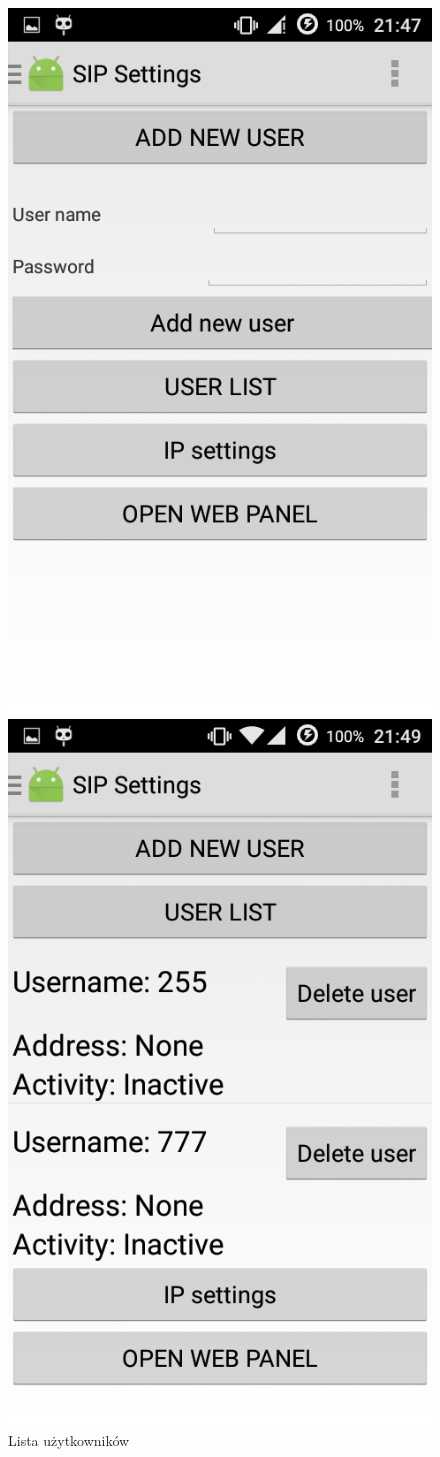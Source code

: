 \begin{itemize}
\begin{figure}[H]
	\includegraphics[width=0.4\linewidth]{Screenshot_2015-09-20-21-47-57}
	\caption{Folmularz dodawania nowego użytkownika}
	\label{fig:Screenshot_2015-09-20-21-47-57}
	\vspace{2cm}
		\centering
		\vspace{1cm}
		\includegraphics[width=0.4\linewidth]{Screenshot_2015-09-20-21-49-48}
		\caption{Lista użytkowników}
		\label{fig:Screenshot_2015-09-20-21-49-48}
\end{figure}


 


\begin{figure}[H]
 

\end{figure}
\end{itemize}
